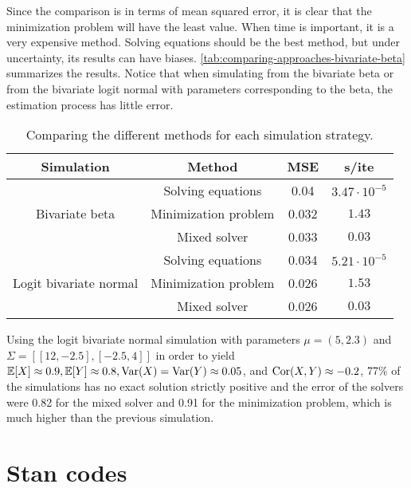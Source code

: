 Since the comparison is in terms of mean squared error, it is clear that the
minimization problem will have the least value. When time is important, it is
a very expensive method. Solving equations should be the best method, but
under uncertainty, its results can have biases.
\autoref{tab:comparing-approaches-bivariate-beta} summarizes the results. 
Notice that when simulating from the bivariate beta or from the bivariate
logit normal with parameters corresponding to the beta, the estimation process
has little error. 

\begin{table}[hb]
  \centering
  \caption{\label{tab:comparing-approaches-bivariate-beta}Comparing the
  different methods for each simulation strategy.}
  \begin{tabular}{cccc}
  \hline
  \multicolumn{1}{c}{\textbf{Simulation}} & \textbf{Method} & \textbf{MSE} & \textbf{s/ite} \\ \hline
  \multirow{3}{*}{Bivariate beta} & Solving equations & 0.04 & $3.47 \cdot 10^{-5}$ \\
   & Minimization problem & 0.032 & $1.43$ \\
   & Mixed solver & 0.033 & $0.03$ \\
  \multirow{3}{*}{Logit bivariate normal} & Solving equations & 0.034 & $5.21 \cdot 10^{-5}$ \\
   & Minimization problem & 0.026 & $1.53$ \\
   & Mixed solver & 0.026 & $0.03$  \\ \hline
  \end{tabular}
\end{table}

Using the logit bivariate normal simulation with parameters $\mu = (5, 2.3)$
and $\Sigma = [[12, -2.5], [-2.5, 4]]$ in order to yield $\mathbb{E}[X] \approx 0.9,
\mathbb{E}[Y] \approx 0.8, \operatorname{Var}(X) = \operatorname{Var}(Y) \approx 0.05$, and $\operatorname{Cor}(X,Y) \approx
-0.2$, 77\% of the simulations has no exact solution strictly positive and the
error of the solvers were 0.82 for the mixed solver and 0.91 for the
minimization problem, which is much higher than the previous simulation. 

\chapter{Stan codes}
\label{appendix:stan-codes}

